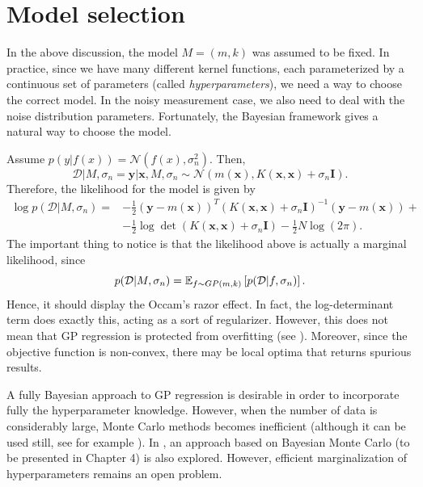 \section{Model selection}
In the above discussion, the model $M = (m,k)$ was assumed to be fixed. In practice, since we have many different kernel functions, each parameterized by a continuous set of parameters (called \textit{hyperparameters}), we need a way to choose the correct model. In the noisy measurement case, we also need to deal with the noise distribution parameters. Fortunately, the Bayesian framework gives a natural way to choose the model. 

Assume $p(y|f(x)) = \mathcal{N}(f(x),\sigma_n^2)$. Then, 
\begin{displaymath}
\mathcal{D}|M,\sigma_n = \mathbf{y} | \mathbf{x},M,\sigma_n \sim 
\mathcal{N}(m(\mathbf{x}),K(\mathbf{x},\mathbf{x}) + \sigma_n \mathbf{I}).
\end{displaymath}
Therefore, the likelihood for the model is given by 
\begin{equation}\label{loglikelihoodGP}
\begin{split}
\log p(\mathcal{D}|M,\sigma_n) = & -\frac{1}{2}(\mathbf{y} - m(\mathbf{x}))^T (K(\mathbf{x},\mathbf{x}) + \sigma_n \mathbf{I})^{-1} (\mathbf{y} - m(\mathbf{x})) + \\
&-\frac{1}{2} \log \det (K(\mathbf{x},\mathbf{x}) + \sigma_n \mathbf{I}) - \frac{1}{2} N \log(2\pi).
\end{split}
\end{equation}
The important thing to notice is that the likelihood above is actually a marginal likelihood, since
\begin{equation}
p(\mathcal{D}|M,\sigma_n) = {\mathbb E}_{f \sim GP(m,k)} \left[p(\mathcal{D}|f,\sigma_n) \right].
\end{equation}
Hence, it should display the Occam's razor effect. In fact, the log-determinant term does exactly this, acting as a sort of regularizer. However, this does not mean that GP regression is protected from overfitting (see \cite{Mohammed_2017}). Moreover, since the objective function is non-convex, there may be local optima that returns spurious results.

A fully Bayesian approach to GP regression is desirable in order to incorporate fully the hyperparameter knowledge. However, when the number of data is considerably large, Monte Carlo methods becomes inefficient (although it can be used still, see for example \cite{Neal_1997,Petelin_2014}). In \cite{Osborne_2007}, an approach based on Bayesian Monte Carlo (to be presented in Chapter 4) is also explored. However, efficient marginalization of hyperparameters remains an open problem.

